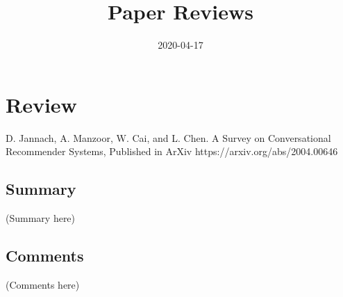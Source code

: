 \documentclass{article}
\begin{document}
\title{Paper Reviews}
\date{2020-04-17}
\maketitle

\section*{Review}
D. Jannach, A. Manzoor, W. Cai, and L. Chen. A Survey on Conversational 
Recommender Systems, Published in ArXiv https://arxiv.org/abs/2004.00646

\subsection*{Summary}
(Summary here)

\subsection*{Comments}
(Comments here)
\end{document}

